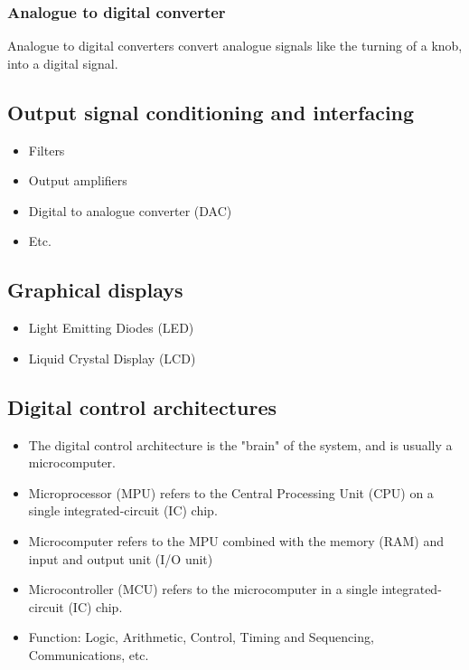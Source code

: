 \documentclass[11pt]{article}
\begin{document}
\subsubsection{Analogue to digital converter}
\label{sec:orgec853f6}
Analogue to digital converters convert analogue signals like the turning of a knob, into a digital signal.

\subsection{Output signal conditioning and interfacing}
\label{sec:org2cc5742}
\begin{itemize}
\item Filters
\item Output amplifiers
\item Digital to analogue converter (DAC)
\item Etc.
\end{itemize}

\subsection{Graphical displays}
\label{sec:org14af6bd}
\begin{itemize}
\item Light Emitting Diodes (LED)
\item Liquid Crystal Display (LCD)
\end{itemize}

 \newpage

\subsection{Digital control architectures}
\label{sec:orgead4cd4}
\begin{itemize}
\item The digital control architecture is the "brain" of the system, and is usually a microcomputer.
\item Microprocessor (MPU) refers to the Central Processing Unit (CPU) on a single integrated-circuit (IC) chip.
\item Microcomputer refers to the MPU combined with the memory (RAM) and input and output unit (I/O unit)
\item Microcontroller (MCU) refers to the microcomputer in a single integrated-circuit (IC) chip.
\item Function: Logic, Arithmetic, Control, Timing and Sequencing, Communications, etc.
\end{itemize}
\end{document}

